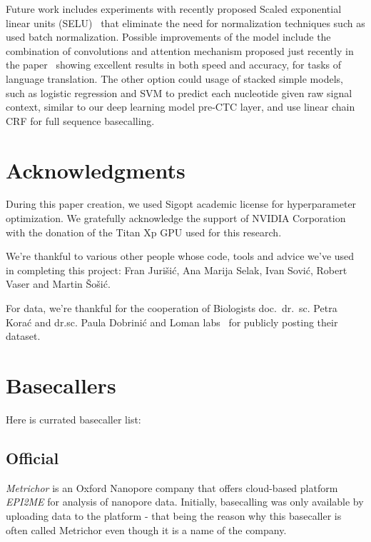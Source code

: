 \documentclass[runningheads,a4paper]{llncs}
\begin{document}
Future work includes experiments with recently proposed Scaled exponential linear units (SELU)~\cite{selu} that eliminate the need for normalization techniques such as used batch normalization. Possible improvements of the model include the combination of convolutions and attention mechanism proposed just recently in the paper~\cite{facebook} showing excellent results in both speed and accuracy, for tasks of language translation. The other option could usage of stacked simple models, such as logistic regression and SVM to predict each nucleotide given raw signal context, similar to our deep learning model pre-CTC layer, and use linear chain CRF for full sequence basecalling.

\section{Acknowledgments}

During this paper creation, we used Sigopt academic license for hyperparameter optimization. We gratefully acknowledge the support of NVIDIA Corporation with the donation of the Titan Xp GPU used for this research.

We're thankful to various other people whose code, tools and advice we've used in completing this project: Fran Jurišić, Ana Marija Selak, Ivan Sović, Robert Vaser and Martin Šošić.

For data, we're thankful for the cooperation of Biologists doc.~dr.~sc. Petra Korać and dr.sc. Paula Dobrinić and Loman labs~\cite{loman1-100k} for publicly posting their dataset.

% 


\appendix
\section{Basecallers}\label{app:basecallers}
Here is currated basecaller list:

\subsection{Official}
\emph{Metrichor} is an Oxford Nanopore company that offers cloud-based platform \emph{EPI2ME} for analysis of nanopore data.
Initially, basecalling was only available by uploading data to the platform - that being the reason why this basecaller is often called Metrichor even though it is a name of the company.
\end{document}
